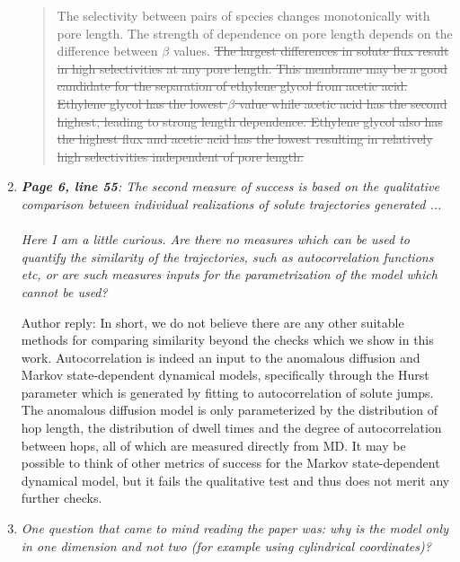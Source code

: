 \documentclass{article}
\begin{document}
\begin{enumerate}[label={Comment \theenumi :}, leftmargin=3.9\parindent]
\begin{quote}
          The selectivity between pairs of species changes monotonically with
	      pore length. The strength of dependence on pore length depends on
	      the difference between $\beta$ values. 
	      \sout{The largest differences in solute
	      flux result in high selectivities at any pore length. This membrane
	      may be a good candidate for the separation of ethylene glycol from
	      acetic acid. Ethylene glycol has the lowest $\beta$ value while
	      acetic acid has the second highest, leading to strong length
	      dependence. Ethylene glycol also has the highest flux and acetic acid
	      has the lowest resulting in relatively high selectivities independent
	      of pore length.}
	  
        \end{quote}
		
  \item \textit{\textbf{Page 6, line 55}: The second measure of success is based on the qualitative
        comparison between individual realizations of solute trajectories generated ...\\ \\
		Here I am a little curious. Are there no measures which can be used to quantify the similarity of
		the trajectories, such as autocorrelation functions etc, or are such measures inputs for the
		parametrization of the model which cannot be used?}
		
		Author reply: In short, we do not believe there are any other suitable methods for comparing
		similarity beyond the checks which we show in this work. Autocorrelation is indeed an input 
		to the anomalous diffusion and Markov state-dependent dynamical models, specifically through
		the Hurst parameter which is generated by fitting to autocorrelation of solute jumps. The
		anomalous diffusion model is only parameterized by the distribution of hop length, the 
		distribution of dwell times and the degree of autocorrelation between hops, all of which
		are measured directly from MD. It may be possible to think of other metrics of success
		for the Markov state-dependent dynamical model, but it fails the qualitative test and
		thus does not merit any further checks.
		

  \item \textit{One question that came to mind reading the paper was: why is the model only in 
  		one dimension and not two (for example using cylindrical coordinates)?}


\end{enumerate}
\end{document}
